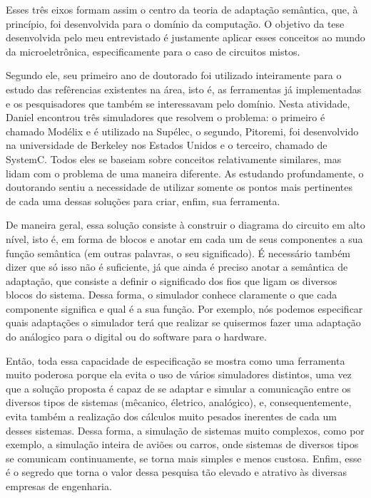 \documentclass{article}
\begin{document}
\vspace{12pt}

Esses três eixos formam assim o centro da teoria de adaptação semântica, que, à
princípio, foi desenvolvida para o domínio da computação. O objetivo da tese
desenvolvida pelo meu entrevistado é justamente aplicar esses conceitos ao mundo
da microeletrônica, especificamente para o caso de circuitos mistos.

\vspace{12pt}

Segundo ele, seu primeiro ano de doutorado foi utilizado inteiramente para o
estudo das refêrencias existentes na área, isto é, as ferramentas já
implementadas e os pesquisadores que também se interessavam pelo domínio. Nesta
atividade, Daniel encontrou três simuladores que resolvem o problema: o
primeiro é chamado Modélix e é utilizado na Supélec, o segundo, Pitoremi, foi
desenvolvido na universidade de Berkeley nos Estados Unidos e o terceiro,
chamado de SystemC. Todos eles se baseiam sobre conceitos relativamente
similares, mas lidam com o problema de uma maneira diferente. As estudando
profundamente, o doutorando sentiu a necessidade de utilizar somente os pontos
mais pertinentes de cada uma dessas soluções para criar, enfim, sua ferramenta. 

\vspace{12pt}

De maneira geral, essa solução consiste à construir o diagrama do circuito em
alto nível, isto é, em forma de blocos e anotar em cada um de seus componentes a
sua função semântica (em outras palavras, o seu significado). É necessário
também dizer que só isso não é suficiente, já que ainda é preciso anotar a
semântica de adaptação, que consiste a definir o significado dos fios que ligam
os diversos blocos do sistema. Dessa forma, o simulador conhece claramente o que
cada componente significa e qual é a sua função. Por exemplo, nós podemos
especificar quais adaptações o simulador terá que realizar se quisermos
fazer uma adaptação do análogico para o digital ou do software para o hardware.

\vspace{12pt}

Então, toda essa capacidade de especificação se mostra como uma ferramenta
muito poderosa porque ela evita o uso de vários simuladores distintos, uma vez
que a solução proposta é capaz de se adaptar e simular a comunicação entre os
diversos tipos de sistemas (mêcanico, életrico, analógico), e, consequentemente,
evita também a realização dos cálculos muito pesados inerentes de cada um desses
sistemas. Dessa forma, a simulação de sistemas muito complexos, como por
exemplo, a simulação inteira de aviões ou carros, onde sistemas de diversos
tipos se comunicam continuamente, se torna mais simples e menos custosa. Enfim,
esse é o segredo que torna o valor dessa pesquisa tão elevado e atrativo às
diversas empresas de engenharia.
\end{document}
